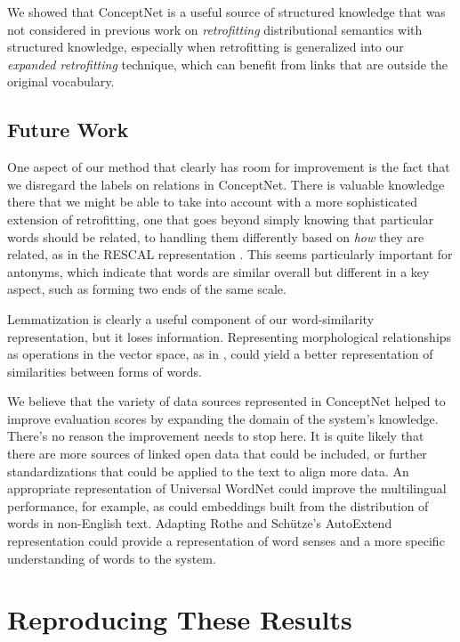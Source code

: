 \documentclass[11pt,letterpaper]{article}
\begin{document}
We showed that ConceptNet is a useful source of structured knowledge that was
not considered in previous work on {\em retrofitting} distributional semantics
with structured knowledge, especially when retrofitting is generalized into our
{\em expanded retrofitting} technique, which can benefit from links that are
outside the original vocabulary.

\subsection{Future Work}

One aspect of our method that clearly has room for improvement is the fact that
we disregard the labels on relations in ConceptNet.  There is valuable
knowledge there that we might be able to take into account with a more
sophisticated extension of retrofitting, one that goes beyond simply knowing
that particular words should be related, to handling them differently based on
{\em how} they are related, as in the RESCAL representation
\cite{nickel2011rescal}. This seems particularly important for antonyms, which
indicate that words are similar overall but different in a key aspect, such as
forming two ends of the same scale.

Lemmatization is clearly a useful component of our word-similarity
representation, but it loses information. Representing morphological
relationships as operations in the vector space, as in
, could yield a better representation of
similarities between forms of words.

We believe that the variety of data sources represented in ConceptNet helped to
improve evaluation scores by expanding the domain of the system's knowledge.
There's no reason the improvement needs to stop here. It is quite likely that
there are more sources of linked open data that could be included, or further
standardizations that could be applied to the text to align more data. An
appropriate representation of Universal WordNet \cite{demelo2009uwn} could
improve the multilingual performance, for example, as could embeddings built
from the distribution of words in non-English text. Adapting Rothe and
Schütze's AutoExtend representation could provide a representation of word
senses and a more specific understanding of words to the system.

\section{Reproducing These Results}
\end{document}

